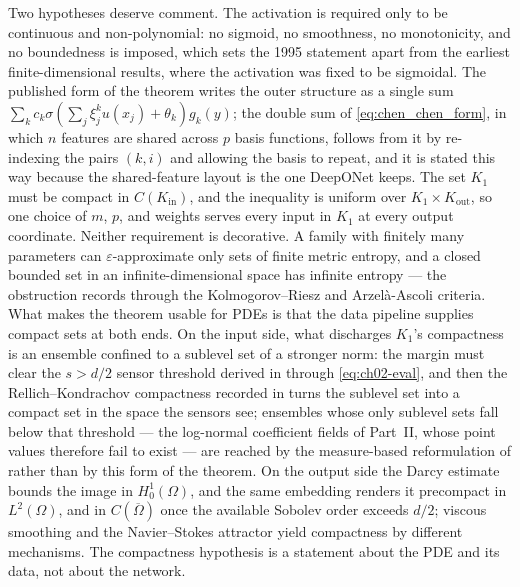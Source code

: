 Two hypotheses deserve comment. The activation is required only to be continuous and non-polynomial: no sigmoid, no smoothness, no monotonicity, and no boundedness is imposed, which sets the 1995 statement apart from the earliest finite-dimensional results, where the activation was fixed to be sigmoidal. The published form of the theorem writes the outer structure as a single sum $\sum_{k} c_k \sigma(\sum_j \xi_j^k u(x_j) + \theta_k) g_k(y)$; the double sum of \eqref{eq:chen_chen_form}, in which $n$ features are shared across $p$ basis functions, follows from it by re-indexing the pairs $(k,i)$ and allowing the basis to repeat, and it is stated this way because the shared-feature layout is the one DeepONet keeps. The set $K_{1}$ must be compact in $C(K_{\mathrm{in}})$, and the inequality is uniform over $K_{1}\times K_{\mathrm{out}}$, so one choice of $m$, $p$, and weights serves every input in $K_{1}$ at every output coordinate. Neither requirement is decorative. A family with finitely many parameters can $\varepsilon$-approximate only sets of finite metric entropy, and a closed bounded set in an infinite-dimensional space has infinite entropy --- the obstruction  records through the Kolmogorov--Riesz and Arzel\`{a}-Ascoli criteria. What makes the theorem usable for PDEs is that the data pipeline supplies compact sets at both ends. On the input side, what discharges $K_{1}$'s compactness is an ensemble confined to a sublevel set of a stronger norm: the margin must clear the $s > d/2$ sensor threshold derived in  through \eqref{eq:ch02-eval}, and then the Rellich--Kondrachov compactness recorded in  turns the sublevel set into a compact set in the space the sensors see; ensembles whose only sublevel sets fall below that threshold --- the log-normal coefficient fields of Part~II, whose point values therefore fail to exist --- are reached by the measure-based reformulation of \cite{lanthaler2022error} rather than by this form of the theorem. On the output side the Darcy estimate bounds the image in $H^{1}_{0}(\Omega)$, and the same embedding renders it precompact in $L^{2}(\Omega)$, and in $C(\overline{\Omega})$ once the available Sobolev order exceeds $d/2$; viscous smoothing and the Navier--Stokes attractor yield compactness by different mechanisms. The compactness hypothesis is a statement about the PDE and its data, not about the network.

